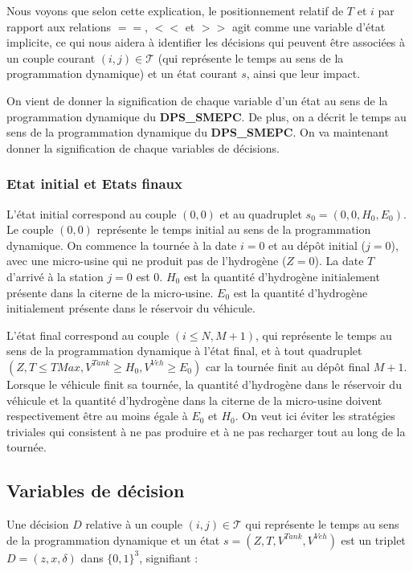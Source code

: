 \begin{Rem}
	\label{Remarque_position_veh}
	Nous voyons que selon cette explication, le positionnement relatif de $T$ et $i$ par rapport aux relations $==$, $<<$ et $>>$ agit comme une variable d'état implicite, ce qui nous aidera à identifier les décisions qui peuvent être associées à un couple courant $(i, j) \in \mathcal{T}$ (qui représente le temps au sens de la programmation dynamique) et un état courant $s$, ainsi que leur impact. 
\end{Rem}
On vient de donner la signification de chaque variable d'un état au sens de la programmation dynamique du \textbf{DPS\_SMEPC}. De plus, on a décrit le temps au sens de la programmation dynamique du \textbf{DPS\_SMEPC}. On va maintenant donner la signification de chaque variables de décisions.
\subsubsection{Etat initial et Etats finaux}
L'état initial correspond au couple $(0,0)$ et au quadruplet $s_0=(0,0,H_0,E_0)$. Le couple $(0,0)$ représente le temps initial au sens de la programmation dynamique. On commence la tournée à la date $i=0$ et au dépôt initial ($j=0$), avec une micro-usine qui ne produit pas de l'hydrogène ($Z=0$). La date $T$ d'arrivé à la station $j=0$ est 0. $H_0$ est la quantité d'hydrogène initialement présente dans la citerne de la micro-usine. $E_0$ est la quantité d'hydrogène initialement présente dans le réservoir du véhicule.

L'état final correspond au couple $(i\leq N, M+1)$, qui représente le temps au sens de la programmation dynamique à l'état final, et à tout quadruplet $(Z,T\leq TMax, V^{Tank}\geq H_0, V^{Veh}\geq E_0)$ car la tournée finit au dépôt final $M+1$. Lorsque le véhicule finit sa tournée, la quantité d'hydrogène dans le réservoir du véhicule et la quantité d'hydrogène dans la citerne de la micro-usine doivent respectivement être au moins égale à $E_0$ et $H_0$. On veut ici éviter les stratégies triviales qui consistent à ne pas produire et à ne pas recharger tout au long de la tournée.
\subsection{Variables de décision}	

Une décision $D$ relative à un couple $(i, j) \in \mathcal{T}$ qui représente le temps au sens de la programmation dynamique et un état $s = (Z, T, V^{Tank}, V^{Veh})$ est un triplet $D = (z, x, \delta )$ dans $\{0, 1\}^3$, signifiant :

